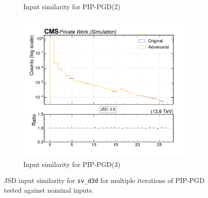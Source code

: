 \begin{figure}[htbp]
\begin{subfigure}[t]{0.32\textwidth}
    \caption*{Input similarity for PIP-PGD(2)}
  \end{subfigure}\hfill
  \begin{subfigure}[t]{0.32\textwidth}
    \includegraphics[width=\linewidth]{media/output/features/compare/combined_it_3/cmp_vtx_arr_sv_d3d.pdf}
    \caption*{Input similarity for PIP-PGD(3)}
  \end{subfigure}

  \caption*{JSD input similarity for \texttt{sv\_d3d} for multiple iterations of PIP-PGD tested against nominal inputs.}
  \label{fig:combined_input_sv_d3d}
\end{figure}

